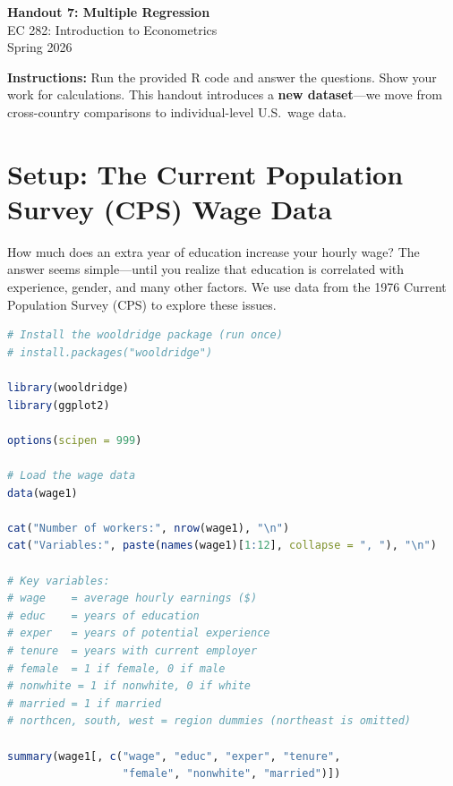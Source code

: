 \documentclass[11pt,letterpaper]{article}
\begin{document}
\begin{center}
{\LARGE\bfseries Handout 7: Multiple Regression}\\[0.5cm]
{\large EC 282: Introduction to Econometrics}\\[0.3cm]
{\large Spring 2026}
\end{center}

\vspace{0.5cm}

\noindent\textbf{Instructions:} Run the provided R code and answer the questions. Show your work for calculations. This handout introduces a \textbf{new dataset}---we move from cross-country comparisons to individual-level U.S.\ wage data.

\vspace{0.5cm}

\section{Setup: The Current Population Survey (CPS) Wage Data}

How much does an extra year of education increase your hourly wage? The answer seems simple---until you realize that education is correlated with experience, gender, and many other factors. We use data from the 1976 Current Population Survey (CPS) to explore these issues.

\begin{lstlisting}[language=R]
# Install the wooldridge package (run once)
# install.packages("wooldridge")

library(wooldridge)
library(ggplot2)

options(scipen = 999)

# Load the wage data
data(wage1)

cat("Number of workers:", nrow(wage1), "\n")
cat("Variables:", paste(names(wage1)[1:12], collapse = ", "), "\n")

# Key variables:
# wage    = average hourly earnings ($)
# educ    = years of education
# exper   = years of potential experience
# tenure  = years with current employer
# female  = 1 if female, 0 if male
# nonwhite = 1 if nonwhite, 0 if white
# married = 1 if married
# northcen, south, west = region dummies (northeast is omitted)

summary(wage1[, c("wage", "educ", "exper", "tenure",
                  "female", "nonwhite", "married")])
\end{lstlisting}
\end{document}
